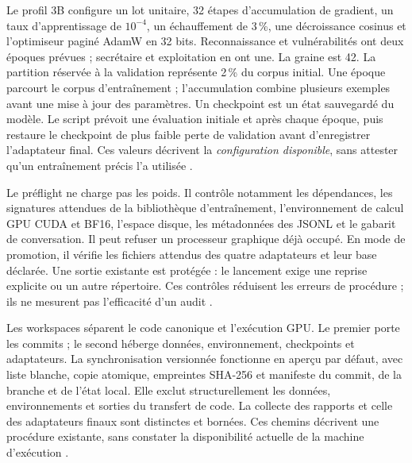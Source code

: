\documentclass[11pt,a4paper]{article}
\begin{document}
Le profil 3B configure un lot unitaire, 32 étapes d'accumulation de gradient,
un taux d'apprentissage de $10^{-4}$, un échauffement de 3\,\%, une décroissance
cosinus et l'optimiseur paginé AdamW en 32 bits. Reconnaissance et vulnérabilités
ont deux époques prévues ; secrétaire et exploitation en ont une. La graine est
42. La partition réservée à la validation représente 2\,\% du corpus initial.
Une époque parcourt le corpus d'entraînement ; l'accumulation combine
plusieurs exemples avant une mise à jour des paramètres. Un checkpoint est
un état sauvegardé du modèle. Le script prévoit une évaluation initiale et
après chaque époque, puis restaure
le checkpoint de plus faible perte de validation avant d'enregistrer
l'adaptateur final. Ces valeurs décrivent la \emph{configuration disponible},
sans attester qu'un entraînement précis l'a utilisée \cite{ml-config,ml-train}.

Le préflight ne charge pas les poids. Il contrôle notamment les dépendances,
les signatures attendues de la bibliothèque d'entraînement, l'environnement
de calcul GPU CUDA et BF16,
l'espace disque, les métadonnées des JSONL et le gabarit de conversation. Il
peut refuser un processeur graphique déjà occupé. En mode de promotion, il
vérifie les fichiers attendus des quatre adaptateurs et leur base déclarée.
Une sortie existante est protégée : le lancement exige une reprise explicite
ou un autre répertoire. Ces contrôles réduisent les erreurs de procédure ; ils
ne mesurent pas l'efficacité d'un audit \cite{ml-preflight,ml-train}.

Les workspaces séparent le code canonique et l'exécution GPU. Le premier porte
les commits ; le second héberge données, environnement, checkpoints et
adaptateurs. La synchronisation versionnée fonctionne en aperçu par défaut,
avec liste blanche, copie atomique, empreintes SHA-256 et manifeste du commit,
de la branche et de l'état local. Elle exclut structurellement les données,
environnements et sorties du transfert de code. La collecte des rapports et
celle des adaptateurs finaux sont distinctes et bornées. Ces chemins décrivent
une procédure existante, sans constater la disponibilité actuelle de la machine
d'exécution \cite{ml-workspaces,ml-sync}.
\end{document}
